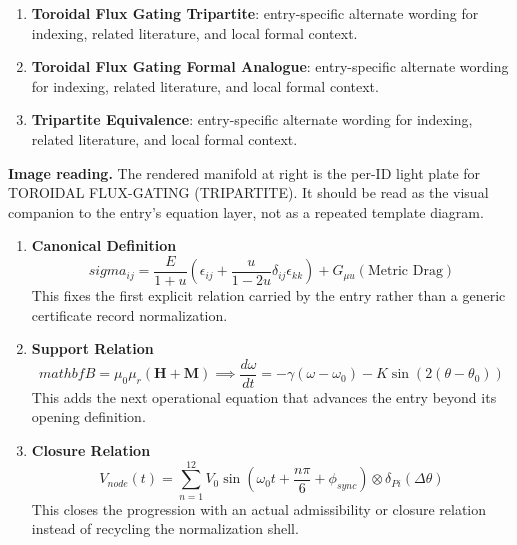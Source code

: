 \begin{enumerate}[leftmargin=1.6em,itemsep=6pt,topsep=4pt]
\item \textbf{Toroidal Flux Gating Tripartite}: entry-specific alternate wording for indexing, related literature, and local formal context.
\item \textbf{Toroidal Flux Gating Formal Analogue}: entry-specific alternate wording for indexing, related literature, and local formal context.
\item \textbf{Tripartite Equivalence}: entry-specific alternate wording for indexing, related literature, and local formal context.
\end{enumerate}

\begin{samepage}
\noindent\begin{minipage}[t]{0.45\linewidth}
\vspace{0pt}
\raggedright
\scriptsize\textbf{Image reading.} The rendered manifold at right is the per-ID light plate for TOROIDAL FLUX-GATING (TRIPARTITE). It should be read as the visual companion to the entry's equation layer, not as a repeated template diagram.\par
\end{minipage}\hfill
\begin{minipage}[t]{0.53\linewidth}
\vspace*{-0.10in}
\raggedright
{}
\end{minipage}
\end{samepage}

\clearpage


\begin{enumerate}[leftmargin=1.6em,itemsep=9pt,topsep=6pt]
\item \textbf{Canonical Definition}
\[
sigma_{ij} = \frac{E}{1+ u} \left( \epsilon_{ij} + \frac{ u}{1-2 u} \delta_{ij}\epsilon_{kk} \right) + G_{\mu u}(\text{Metric Drag})
\]
This fixes the first explicit relation carried by the entry rather than a generic certificate record normalization.

\item \textbf{Support Relation}
\[
mathbf{B} = \mu_0\mu_r(\mathbf{H}+\mathbf{M}) \implies \frac{d\omega}{dt} = -\gamma(\omega - \omega_0) - K \sin(2(\theta - \theta_0))
\]
This adds the next operational equation that advances the entry beyond its opening definition.

\item \textbf{Closure Relation}
\[
V_{node}(t) = \sum_{n=1}^{12} V_0 \sin\left(\omega_0 t + \frac{n\pi}{6} + \phi_{sync}\right) \otimes \delta_{Pi}(\Delta\theta)
\]
This closes the progression with an actual admissibility or closure relation instead of recycling the normalization shell.
\end{enumerate}

